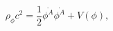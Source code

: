 \begin{equation}
\rho _\phi c^2=\frac{1}{2}\stackrel{.}{\phi ^A}\stackrel{.}{\phi
^A}+V(\phi ), \label{ed}
\end{equation}

